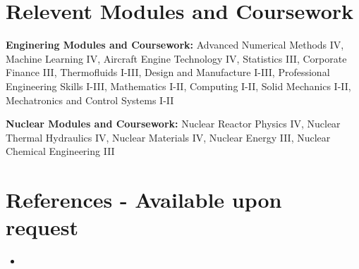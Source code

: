 \documentclass[letterpaper,11pt]{article}
\newcommand{\resumeItem}[1]{
  \item\small{
    {#1 \vspace{-2pt}}
  }
}
\newcommand{\resumeSubHeadingListStart}{\begin{itemize}[leftmargin=0.15in, label={}]}
\newcommand{\resumeSubHeadingListEnd}{\end{itemize}}
\begin{document}

\section{Relevent Modules and Coursework}
  \vspace{2pt}
  \resumeSubHeadingListStart
    \small{\item{
        \textbf{Enginering Modules and Coursework:}{ Advanced Numerical Methods IV, Machine Learning IV, Aircraft Engine Technology IV, Statistics III, Corporate Finance III, Thermofluids I-III, Design and Manufacture I-III, Professional Engineering Skills I-III, Mathematics I-II, Computing I-II, Solid Mechanics I-II, Mechatronics and Control Systems I-II} \\ \vspace{-0.17in}        
        
        \textbf{Nuclear Modules and Coursework:}{ Nuclear Reactor Physics IV, Nuclear Thermal Hydraulics IV, Nuclear Materials IV, Nuclear Energy III, Nuclear Chemical Engineering III} \\ \vspace{-0.17in}        
    }}
  \resumeSubHeadingListEnd

  

\section{\hspace*{\fill}References - Available upon request\hspace*{\fill}}
  \resumeSubHeadingListStart
    \resumeItem{}
  \resumeSubHeadingListEnd



\end{document}
